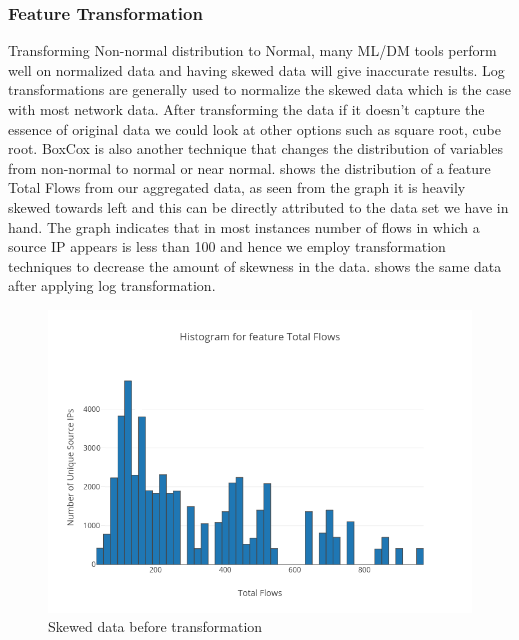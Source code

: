 \subsubsection{Feature Transformation} 
Transforming Non-normal distribution to Normal, many ML/DM tools perform well on normalized data and having skewed data will give inaccurate results. Log transformations are generally used to normalize the skewed data which is the case with most network data. After transforming the data if it doesn't capture the essence of original data we could look at other options such as square root, cube root. BoxCox is also another technique that changes the distribution of variables from non-normal to normal or near normal.  shows the distribution of a feature Total Flows from our aggregated data, as seen from the graph it is heavily skewed towards left and this can be directly attributed to the data set we have in hand. The graph indicates that in most instances number of flows in which a source IP appears is less than 100 and hence we employ transformation techniques to decrease the amount of skewness in the data.   shows the same data after applying log transformation. 

\begin{figure}[ht]
	\centerline{\includegraphics[scale = 0.9]{feature.png}}
	\caption{Skewed data before transformation}%
\end{figure}


